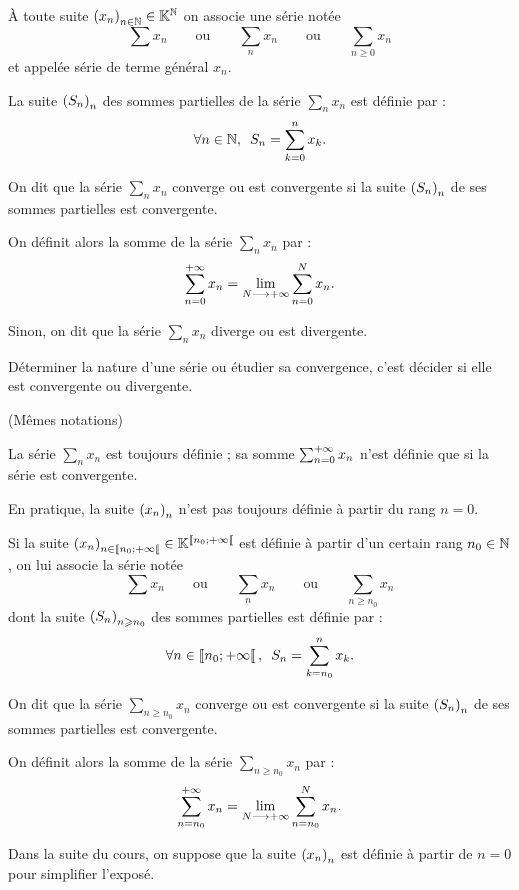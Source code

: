 \begin{defi}
À toute suite \(\left(x_n\right)_{n\in\mathbb{N}}\in\mathbb{K}^{\mathbb{N}}\) on associe une série notée \[\sum x_n\qquad\text{ou}\qquad\sum_nx_n\qquad\text{ou}\qquad\sum_{n\geq0}x_n\] et appelée série de terme général \(x_n\).

La suite \(\left(S_n\right)_n\) des sommes partielles de la série \(\sum_nx_n\) est définie par : \[\quantifs{\forall n\in\N}S_n=\sum_{k=0}^nx_k.\]

On dit que la série \(\sum_nx_n\) converge ou est convergente si la suite \(\left(S_n\right)_n\) de ses sommes partielles est convergente.

On définit alors la somme de la série \(\sum_nx_n\) par : \[\sum_{n=0}^{+\infty}x_n=\lim_{N\longrightarrow+\infty}\sum_{n=0}^Nx_n.\]

Sinon, on dit que la série \(\sum_nx_n\) diverge ou est divergente.

Déterminer la nature d'une série ou étudier sa convergence, c'est décider si elle est convergente ou divergente.
\end{defi}

\begin{rem}
(Mêmes notations)

La série \(\sum_nx_n\) est toujours définie ; sa somme \(\sum_{n=0}^{+\infty}x_n\) n'est définie que si la série est convergente.
\end{rem}

\begin{rem}
En pratique, la suite \(\left(x_n\right)_n\) n'est pas toujours définie à partir du rang \(n=0\).

Si la suite \(\left(x_n\right)_{n\in\left\llbracket n_0;+\infty\right\llbracket}\in\mathbb{K}^{\left\llbracket n_0;+\infty\right\llbracket}\) est définie à partir d'un certain rang \(n_0\in\mathbb{N}\), on lui associe la série notée \[\sum x_n\qquad\text{ou}\qquad\sum_nx_n\qquad\text{ou}\qquad\sum_{n\geq n_0}x_n\] dont la suite \(\left(S_n\right)_{n\geqslant n_0}\) des sommes partielles est définie par : \[\quantifs{\forall n\in\interventierie{n_0}{\pinf}}S_n=\sum_{k=n_0}^nx_k.\]

On dit que la série \(\sum_{n\geq n_0}x_n\) converge ou est convergente si la suite \(\left(S_n\right)_n\) de ses sommes partielles est convergente.

On définit alors la somme de la série \(\sum_{n\geq n_0}x_n\) par : \[\sum_{n=n_0}^{+\infty}x_n=\lim_{N\longrightarrow+\infty}\sum_{n=n_0}^Nx_n.\]

Dans la suite du cours, on suppose que la suite \(\left(x_n\right)_n\) est définie à partir de \(n=0\) pour simplifier l'exposé.
\end{rem}

